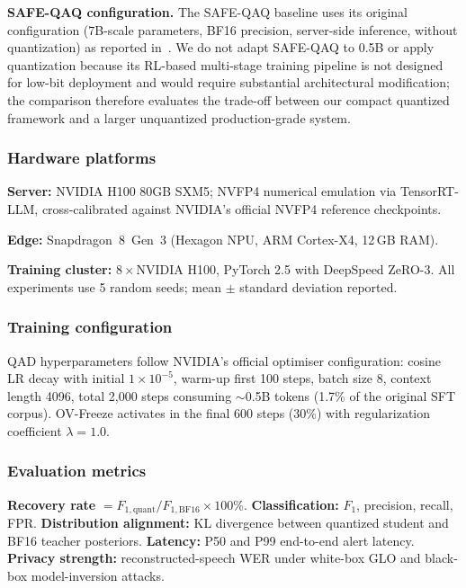 \documentclass[11pt, a4paper]{article}
\begin{document}
\medskip
\noindent\textbf{SAFE-QAQ configuration.} The SAFE-QAQ baseline uses its original configuration (7B-scale parameters, BF16 precision, server-side inference, without quantization) as reported in~\cite{2}. We do not adapt SAFE-QAQ to 0.5B or apply quantization because its RL-based multi-stage training pipeline is not designed for low-bit deployment and would require substantial architectural modification; the comparison therefore evaluates the trade-off between our compact quantized framework and a larger unquantized production-grade system.

\subsubsection{Hardware platforms}

\textbf{Server:} NVIDIA H100 80GB SXM5; NVFP4 numerical emulation via TensorRT-LLM, cross-calibrated against NVIDIA's official NVFP4 reference checkpoints.

\textbf{Edge:} Snapdragon~8~Gen~3 (Hexagon NPU, ARM Cortex-X4, 12\,GB RAM).

\textbf{Training cluster:} $8\times$NVIDIA H100, PyTorch 2.5 with DeepSpeed ZeRO-3. All experiments use 5 random seeds; mean $\pm$ standard deviation reported.

\subsubsection{Training configuration}

QAD hyperparameters follow NVIDIA's official optimiser configuration: cosine LR decay with initial $1\times 10^{-5}$, warm-up first 100 steps, batch size 8, context length 4096, total 2{,}000 steps consuming $\sim$0.5B tokens (1.7\% of the original SFT corpus). OV-Freeze activates in the final 600 steps (30\%) with regularization coefficient $\lambda = 1.0$.

\subsubsection{Evaluation metrics}

\textbf{Recovery rate} $= F_{1,\mathrm{quant}}/F_{1,\mathrm{BF16}}\times 100\%$. \textbf{Classification:} $F_1$, precision, recall, FPR. \textbf{Distribution alignment:} KL divergence between quantized student and BF16 teacher posteriors. \textbf{Latency:} P50 and P99 end-to-end alert latency. \textbf{Privacy strength:} reconstructed-speech WER under white-box GLO and black-box model-inversion attacks.
\end{document}

